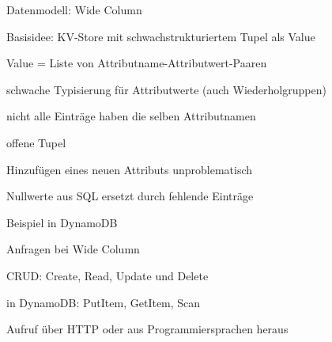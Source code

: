 \documentclass[a4paper]{article}
\begin{document}
\begin{multicols}{3}
\begin{itemize*}
    Datenmodell: Wide Column
    \begin{itemize*}
        \item Basisidee: KV-Store mit schwachstrukturiertem Tupel als Value
        \item Value = Liste von Attributname-Attributwert-Paaren
        \begin{itemize*}
            \item schwache Typisierung für Attributwerte (auch Wiederholgruppen)
        \end{itemize*}
        \item nicht alle Einträge haben die selben Attributnamen
        \begin{itemize*}
            \item offene Tupel
            \item Hinzufügen eines neuen Attributs unproblematisch
            \item Nullwerte aus SQL ersetzt durch fehlende Einträge
        \end{itemize*}
        \item Beispiel in DynamoDB
        \item Anfragen bei Wide Column
        \begin{itemize*}
            \item CRUD: Create, Read, Update und Delete
            \item in DynamoDB: PutItem, GetItem, Scan
            \item Aufruf über HTTP oder aus Programmiersprachen heraus
        \end{itemize*}
    \end{itemize*}



\end{itemize*}
\end{multicols}
\end{document}

